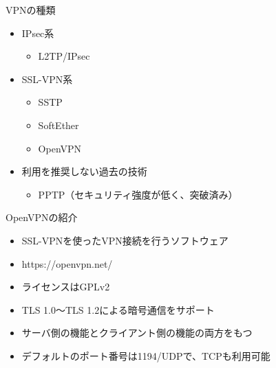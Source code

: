 
\begin{frame}[containsverbatim]{VPNの種類}
  \begin{itemize}
  \item IPsec系
    \begin{itemize}
    \item L2TP/IPsec
    \end{itemize}
  \item SSL-VPN系
    \begin{itemize}
    \item SSTP
    \item SoftEther
    \item OpenVPN
    \end{itemize}
  \item 利用を推奨しない過去の技術
    \begin{itemize}
    \item PPTP（セキュリティ強度が低く、突破済み）
    \end{itemize}
  \end{itemize}
\end{frame}



\begin{frame}[containsverbatim]{OpenVPNの紹介}
  \begin{itemize}
  \item SSL-VPNを使ったVPN接続を行うソフトウェア
  \item https://openvpn.net/
  \item ライセンスはGPLv2
  \item TLS 1.0〜TLS 1.2による暗号通信をサポート
  \item サーバ側の機能とクライアント側の機能の両方をもつ
  \item デフォルトのポート番号は1194/UDPで、TCPも利用可能
  \end{itemize}
\end{frame}


